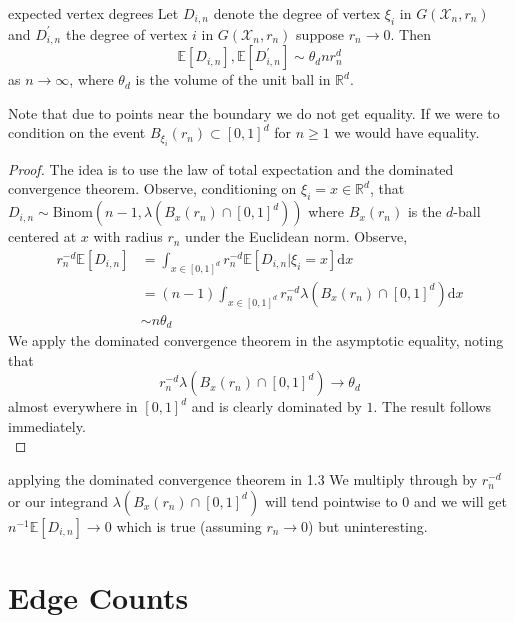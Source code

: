 \documentclass{article}
\begin{document}
\begin{proposition}[]{expected vertex degrees}
    Let $D_{i, n}$ denote the degree of vertex $\xi_i$ in $G(\mathcal{X}_n, r_n)$ and $D_{i, n}^\prime$ the degree 
    of vertex $i$ in $G(\mathcal{X}_n, r_n)$ suppose $r_n \to 0$. Then 
    \[\mathbb{E}[D_{i, n}], \mathbb{E}[D^\prime_{i, n}] \sim \theta_d n r_n^d\]
    as $n \to \infty$, where $\theta_d$ is the volume of the unit ball in $\mathbb{R}^d$.
\end{proposition}

Note that due to points near the boundary we do not get equality. If we were to condition on the event $B_{\xi_i}(r_n) 
\subset [0,1]^d$ for $n \geq 1$ we would have equality.

\begin{proof}
    The idea is to use the law of total expectation and the dominated convergence theorem. Observe, conditioning on 
    $\xi_i = x \in \mathbb{R}^d$, that $D_{i, n} \sim \text{Binom}(n - 1, \lambda(B_x(r_n) \cap [0,1]^d))$ where 
    $B_x(r_n)$ is the $d$-ball centered at $x$ with radius $r_n$ under the Euclidean norm. Observe,
    \begin{align*}
        r_n^{-d}\mathbb{E}[D_{i,n}] &=  
        \int_{x \in [0,1]^d} r_n^{-d}\mathbb{E}[D_{i, n} | \xi_i = x]\mathrm{d}x \\
        &= (n-1)\int_{x \in [0,1]^d} r_n^{-d} \lambda(B_x(r_n) \cap [0,1]^d)\mathrm{d}x \\
        &\sim n\theta_d
    \end{align*}
    We apply the dominated convergence theorem in the asymptotic equality, noting that \[r_n^{-d} \lambda(B_x(r_n) \cap [0,1]^d) 
    \to \theta_d\] almost everywhere in $[0,1]^d$ and is clearly dominated by $1$. The result follows immediately. \\
\end{proof}

\begin{remark}[]{applying the dominated convergence theorem in 1.3}
    We multiply through by $r_n^{-d}$ or our integrand $\lambda(B_x(r_n) \cap [0,1]^d)$ will tend pointwise to $0$ 
    and we will get $n^{-1}\mathbb{E}[D_{i, n}] \to 0$ which is true (assuming $r_n \to 0$) but uninteresting. 
\end{remark}


\section{Edge Counts}   
\end{document}
